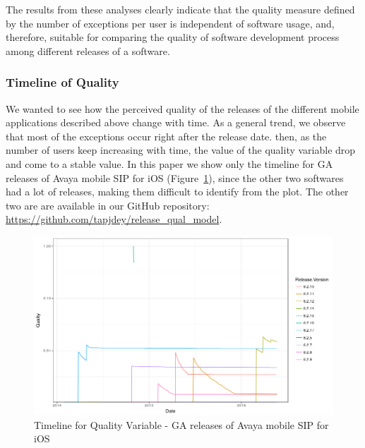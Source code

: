 \documentclass[smallcondensed]{svjour3}     %
\begin{document}

The results from these analyses clearly indicate that the quality measure defined by the number of exceptions per user is independent of software usage, and, therefore, suitable for comparing the quality of software development process among different releases of a software.

\subsubsection{Timeline of Quality}
We wanted to see how the perceived quality of the releases of the different mobile applications described above change with time. As a general trend, we observe that most of the exceptions occur right after the release date. then, as the number of users keep increasing with time, the value of the quality variable drop and come to a stable value.  In this paper we show only the timeline for GA releases of Avaya mobile SIP for iOS (Figure~\ref{fig:tI}), since the other two softwares had a lot of releases, making them difficult to identify from the plot. The other two are  are available in our GitHub repository:\\ \url{https://github.com/tapjdey/release\_qual\_model}.


\begin{figure}[!t]
\centering
\includegraphics[width=\linewidth]{timeline_I}
\caption{Timeline for Quality Variable - GA releases of Avaya mobile SIP for iOS}
\label{fig:tI}
\vspace{-10pt}
\end{figure}
\end{document}
